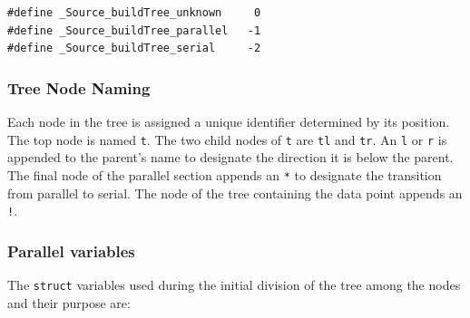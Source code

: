 \documentclass{article}
\begin{document}
\lstset{language=C++, keepspaces=true}
\begin{lstlisting}
#define _Source_buildTree_unknown     0
#define _Source_buildTree_parallel   -1
#define _Source_buildTree_serial     -2
\end{lstlisting}

%
%

\subsubsection{Tree Node Naming}

Each node in the tree is assigned a unique identifier determined by its position. The top node is named \texttt{t}. The two child nodes of \texttt{t} are \texttt{tl} and \texttt{tr}. An \texttt{l} or \texttt{r} is appended to the parent's name to designate the direction it is below the parent. The final node of the parallel section appends an \texttt{*} to designate the transition from parallel to serial. The node of the tree containing the data point appends an \texttt{!}.


%
%

\subsubsection{Parallel variables}

The \texttt{struct} variables used during the initial division of the tree among the nodes and their purpose are:
\end{document}

